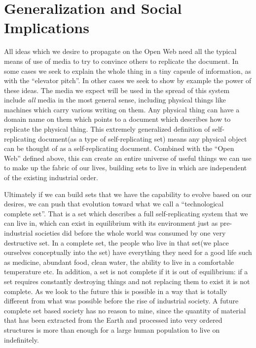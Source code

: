 \documentclass[12pt,a4paper]{amsart}
\numberwithin{equation}{section}
\begin{document}
\section{Generalization and Social
Implications}\label{generalization-and-social-implications}

All ideas which we desire to propagate on the Open Web need all the
typical means of use of media to try to convince others to replicate the
document. In some cases we seek to explain the whole thing in a tiny
capsule of information, as with the ``elevator pitch''. In other cases
we seek to show by example the power of these ideas. The media we expect
will be used in the spread of this system include \emph{all} media in
the most general sense, including physical things like machines which
carry various writing on them. Any physical thing can have a domain name
on them which points to a document which describes how to replicate the
physical thing. This extremely generalized definition of
self-replicating document(as a type of self-replicating set) means any
physical object can be thought of as a self-replicating document.
Combined with the ``Open Web'' defined above, this can create an entire
universe of useful things we can use to make up the fabric of our lives,
building sets to live in which are independent of the existing
industrial order.

Ultimately if we can build sets that we have the capability to evolve
based on our desires, we can push that evolution toward what we call a
``technological complete set''. That is a set which describes a full
self-replicating system that we can live in, which can exist in
equilibrium with its environment just as pre-industrial societies did
before the whole world was consumed by one very destructive set. In a
complete set, the people who live in that set(we place ourselves
conceptually into the set) have everything they need for a good life
such as medicine, abundant food, clean water, the ability to live in a
comfortable temperature etc. In addition, a set is not complete if it is
out of equilibrium: if a set requires constantly destroying things and
not replacing them to exist it is not complete. As we look to the future
this is possible in a way that is totally different from what was
possible before the rise of industrial society. A future complete set
based society has no reason to mine, since the quantity of material that
has been extracted from the Earth and processed into very ordered
structures is more than enough for a large human population to live on
indefinitely.
\end{document}
